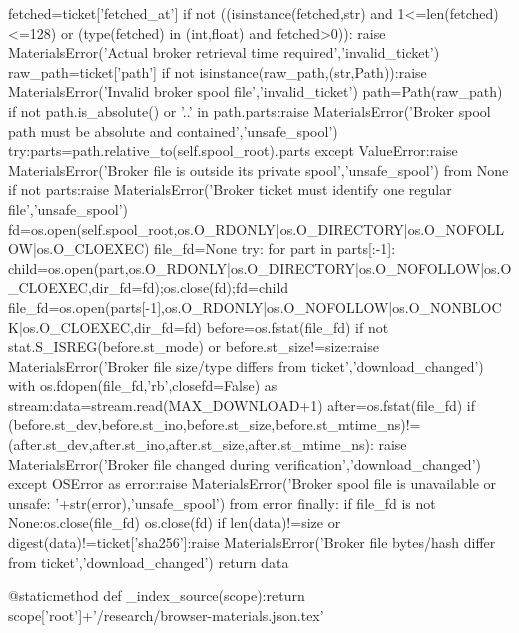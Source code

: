         fetched=ticket['fetched_at']
        if not ((isinstance(fetched,str) and 1<=len(fetched)<=128) or (type(fetched) in (int,float) and fetched>0)):
            raise MaterialsError('Actual broker retrieval time required','invalid_ticket')
        raw_path=ticket['path']
        if not isinstance(raw_path,(str,Path)):raise MaterialsError('Invalid broker spool file','invalid_ticket')
        path=Path(raw_path)
        if not path.is_absolute() or '..' in path.parts:raise MaterialsError('Broker spool path must be absolute and contained','unsafe_spool')
        try:parts=path.relative_to(self.spool_root).parts
        except ValueError:raise MaterialsError('Broker file is outside its private spool','unsafe_spool') from None
        if not parts:raise MaterialsError('Broker ticket must identify one regular file','unsafe_spool')
        fd=os.open(self.spool_root,os.O_RDONLY|os.O_DIRECTORY|os.O_NOFOLLOW|os.O_CLOEXEC)
        file_fd=None
        try:
            for part in parts[:-1]:
                child=os.open(part,os.O_RDONLY|os.O_DIRECTORY|os.O_NOFOLLOW|os.O_CLOEXEC,dir_fd=fd);os.close(fd);fd=child
            file_fd=os.open(parts[-1],os.O_RDONLY|os.O_NOFOLLOW|os.O_NONBLOCK|os.O_CLOEXEC,dir_fd=fd)
            before=os.fstat(file_fd)
            if not stat.S_ISREG(before.st_mode) or before.st_size!=size:raise MaterialsError('Broker file size/type differs from ticket','download_changed')
            with os.fdopen(file_fd,'rb',closefd=False) as stream:data=stream.read(MAX_DOWNLOAD+1)
            after=os.fstat(file_fd)
            if (before.st_dev,before.st_ino,before.st_size,before.st_mtime_ns)!=(after.st_dev,after.st_ino,after.st_size,after.st_mtime_ns):
                raise MaterialsError('Broker file changed during verification','download_changed')
        except OSError as error:raise MaterialsError('Broker spool file is unavailable or unsafe: '+str(error),'unsafe_spool') from error
        finally:
            if file_fd is not None:os.close(file_fd)
            os.close(fd)
        if len(data)!=size or digest(data)!=ticket['sha256']:raise MaterialsError('Broker file bytes/hash differ from ticket','download_changed')
        return data

    @staticmethod
    def _index_source(scope):return scope['root']+'/research/browser-materials.json.tex'

